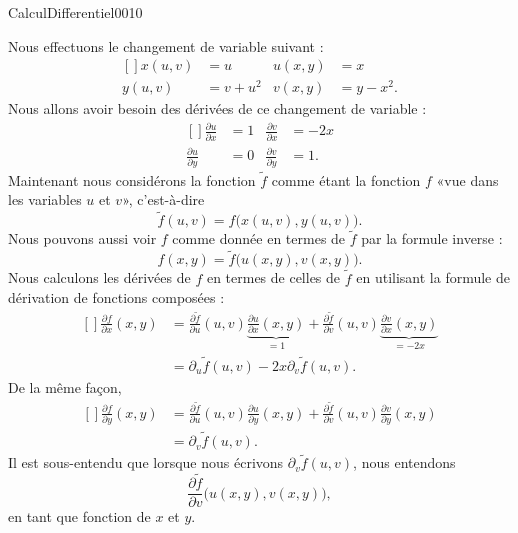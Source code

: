 \begin{corrige}{CalculDifferentiel0010}

	Nous effectuons le changement de variable suivant :
	\begin{equation}
		\begin{aligned}[]
			x(u,v)&=u&u(x,y)&=x\\
			y(u,v)&=v+u^2&v(x,y)&=y-x^2.
		\end{aligned}
	\end{equation}
	Nous allons avoir besoin des dérivées de ce changement de variable :
	\begin{equation}
		\begin{aligned}[]
			\frac{ \partial u }{ \partial x }&=1&\frac{ \partial v }{ \partial x }&=-2x\\
			\frac{ \partial u }{ \partial y }&=0&\frac{ \partial v }{ \partial y }&=1.
		\end{aligned}
	\end{equation}
	Maintenant nous considérons la fonction $\tilde f$ comme étant la fonction $f$ «vue dans les variables $u$ et $v$», c'est-à-dire
	\begin{equation}
		\tilde f(u,v)=f\big( x(u,v),y(u,v) \big).
	\end{equation}
	Nous pouvons aussi voir $f$ comme donnée en termes de $\tilde f$ par la formule inverse :
	\begin{equation}
		f(x,y)=\tilde f\big( u(x,y),v(x,y) \big).
	\end{equation}
	Nous calculons les dérivées de $f$ en termes de celles de $\tilde f$ en utilisant la formule de dérivation de fonctions composées :
	\begin{equation}
		\begin{aligned}[]
			\frac{ \partial f }{ \partial x }(x,y)&=\frac{ \partial \tilde f }{ \partial u }(u,v)\underbrace{\frac{ \partial u }{ \partial x }(x,y)}_{=1}+\frac{ \partial \tilde f }{ \partial v }(u,v)\underbrace{\frac{ \partial v }{ \partial x }(x,y)}_{=-2x}\\
			&=\partial_u\tilde f(u,v)-2x\partial_v\tilde f(u,v).
		\end{aligned}
	\end{equation}
	De la même façon,
	\begin{equation}
		\begin{aligned}[]
			\frac{ \partial f }{ \partial y }(x,y)&=\frac{ \partial \tilde f }{ \partial u }(u,v)\frac{ \partial u }{ \partial y }(x,y)+\frac{ \partial \tilde f }{ \partial v }(u,v)\frac{ \partial v }{ \partial y }(x,y)\\
			&=\partial_v\tilde f(u,v).
		\end{aligned}
	\end{equation}
	Il est sous-entendu que lorsque nous écrivons $\partial_v\tilde f(u,v)$, nous entendons
	\begin{equation}
		\frac{ \partial \tilde f }{ \partial v }\big( u(x,y),v(x,y) \big),
	\end{equation}
	en tant que fonction de $x$ et $y$.


\end{corrige}
